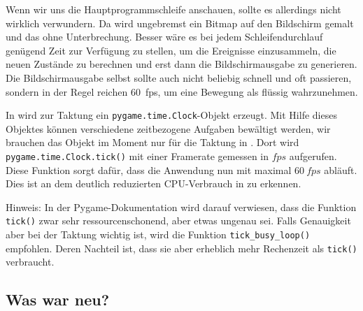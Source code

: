 
Wenn wir uns die Hauptprogrammschleife anschauen, sollte es allerdings nicht wirklich verwundern. Da wird ungebremst ein Bitmap auf den Bildschirm gemalt und das ohne Unterbrechung. Besser wäre es bei jedem Schleifendurchlauf genügend Zeit zur Verfügung zu stellen, um die Ereignisse einzusammeln, die neuen Zustände zu berechnen und erst dann die Bildschirmausgabe zu generieren. Die Bildschirmausgabe selbst sollte auch nicht beliebig schnell und oft passieren, sondern in der Regel reichen 60~\gls{fps}, um eine Bewegung als flüssig wahrzunehmen. 


In  wird zur Taktung ein \texttt{pygame.time.Clock}-Objekt erzeugt. Mit Hilfe dieses Objektes können verschiedene zeitbezogene Aufgaben bewältigt werden, wir brauchen das Objekt im Moment nur für die Taktung in . Dort wird \texttt{pygame.time.Clock.\-tick()} mit einer Framerate gemessen in $fps$ aufgerufen. Diese Funktion sorgt dafür, dass die Anwendung nun mit maximal $60~fps$ abläuft. Dies ist an dem deutlich reduzierten CPU-Verbrauch in  zu erkennen.

Hinweis: In der Pygame-Dokumentation wird darauf verwiesen, dass die Funktion \texttt{tick()} zwar sehr ressourcenschonend, aber etwas ungenau sei. Falls Genauigkeit aber bei der Taktung wichtig ist, wird die Funktion \texttt{tick\_busy\_loop()} empfohlen. Deren Nachteil ist, dass sie aber erheblich mehr Rechenzeit als \texttt{tick()} verbraucht.


\subsection*{Was war neu?}


